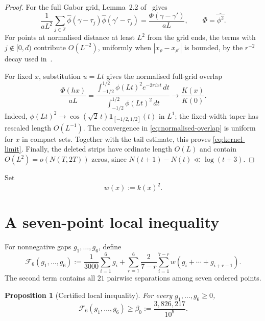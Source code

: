 \documentclass[11pt]{article}
\newtheorem{proposition}[theorem]{Proposition}
\begin{document}
\begin{proof}
For the full Gabor grid, Lemma~2.2 of~\cite{Claude26} gives
\[
 \frac1{aL^2}\sum_{j\in\mathbb Z}
 \widehat\phi(\gamma-\tau_j)\widehat\phi(\gamma'-\tau_j)
 =\frac{\Phi(\gamma-\gamma')}{aL},
 \qquad \Phi=\widehat{\phi^2}.
\]
For points at normalised distance at least $L^2$ from the grid ends, the
terms with $j\notin[0,d)$ contribute $O(L^{-2})$, uniformly when
$|x_\rho-x_{\rho'}|$ is bounded, by the $r^{-2}$ decay used
in~\cite[\S5.3]{Claude26}.

For fixed $x$, substitution $u=Lt$ gives the normalised full-grid overlap
\begin{equation}\label{eq:normalised-overlap}
 \frac{\Phi(hx)}{aL}
 =
 \frac{\displaystyle\int_{-1/2}^{1/2}
       \phi(Lt)^2 e^{-2\pi ixt}\,dt}
      {\displaystyle\int_{-1/2}^{1/2}\phi(Lt)^2\,dt}
 \longrightarrow \frac{K(x)}{K(0)}.
\end{equation}
Indeed,
$\phi(Lt)^2\to\cos(\sqrt2\,t)\mathbf1_{[-1/2,1/2]}(t)$ in $L^1$;
the fixed-width taper has rescaled length $O(L^{-1})$.  The convergence in
\eqref{eq:normalised-overlap} is uniform for $x$ in compact sets.  Together
with the tail estimate, this proves \eqref{eq:kernel-limit}.  Finally, the
deleted strips have ordinate length $O(L)$ and contain $O(L^2)=o(N(T,2T))$
zeros, since $N(t+1)-N(t)\ll\log(t+3)$.
\end{proof}

Set
\[
 w(x):=k(x)^2.
\]

\section{A seven-point local inequality}

For nonnegative gaps $g_1,\ldots,g_6$, define
\begin{equation}\label{eq:F6}
 \mathcal F_6(g_1,\ldots,g_6)
 :=\frac1{3000}\sum_{i=1}^6g_i
 +\sum_{r=1}^6\frac{2}{7-r}
   \sum_{i=1}^{7-r}w(g_i+\cdots+g_{i+r-1}).
\end{equation}
The second term contains all $21$ pairwise separations among seven ordered
points.

\begin{proposition}[Certified local inequality]\label{prop:F6}
For every $g_1,\ldots,g_6\ge0$,
\begin{equation}\label{eq:F6bound}
 \mathcal F_6(g_1,\ldots,g_6)\ge\beta_0:=\frac{3{,}826{,}217}{10^{9}}.
\end{equation}
\end{proposition}
\end{document}

